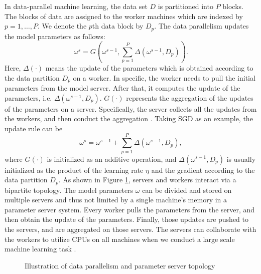 \documentclass[preprint,review,11pt,a4paper]{elsarticle}
\begin{document}
In data-parallel machine learning, the data set $D$ is partitioned into $P$ blocks. The blocks of data are assigned to the worker machines which are indexed by $p=1, \ldots, P$. We denote the $p$th data block by $D_p$. The data parallelism updates the model parameters as follows:
\begin{equation}
\omega^s=G\left(\omega^{s-1}, \sum_{p=1}^P\Delta(\omega^{s-1}, D_p)\right).
\end{equation} Here, $\Delta(\cdot)$ means the update of the parameters which is obtained according to the data partition $D_p$ on a worker. In specific, the worker needs to pull the initial parameters from the model server. After that, it computes the update of the parameters, i.e. $\Delta(\omega^{s-1}, D_p)$. $G(\cdot)$ represents the aggregation of the updates of the parameters on a server. Specifically, the server collects all the updates from the workers, and then conduct the aggregation \cite{ho2013more} \cite{xing2015petuum}. Taking SGD as an example, the update rule can be
\begin{equation}
\omega^s=\omega^{s-1} + \sum_{p=1}^P \Delta(\omega^{s-1}, D_p),
\end{equation}
where $G(\cdot)$ is initialized as an additive operation, and $\Delta(\omega^{s-1}, D_p)$ is usually initialized  as the product of the learning rate $\eta$ and the gradient according to the data partition $D_p$. As shown in Figure \ref{figure_data_parallelism},  servers and workers interact via a bipartite topology. The model parameters $\omega$ can be divided and stored on multiple servers and thus not limited by a single machine's memory in a parameter server system. Every worker pulls the parameters from the server, and then  obtain the update of the parameters. Finally, those updates are pushed to the servers, and are aggregated on those servers. The servers can collaborate with the workers to utilize CPUs on all machines when we conduct a large scale machine learning task \cite{ho2013more} \cite{dai2015high}.

\begin{figure}
\centering
\label{figure_data_parallelism}
\caption{Illustration of data parallelism and parameter server topology}
\label{figure_data_parallelism}
\end{figure}
\end{document}
